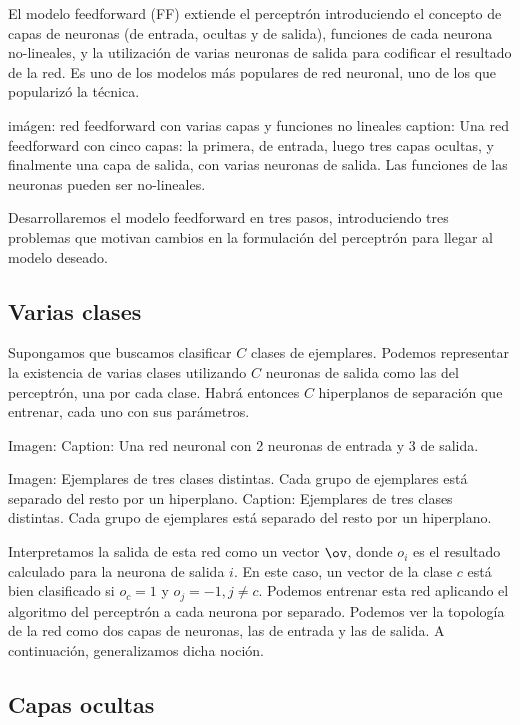 

El modelo feedforward (FF) extiende el perceptrón introduciendo el concepto de capas de neuronas (de entrada, ocultas y de salida), funciones de cada neurona no-lineales, y la utilización de varias neuronas de salida para codificar el resultado de la red. Es uno de los modelos más populares de red neuronal, uno de los que popularizó la técnica.

imágen: red feedforward con varias capas y funciones no lineales
caption: Una red feedforward con cinco capas: la primera, de entrada, luego tres capas ocultas, y finalmente una capa de salida, con varias neuronas de salida. Las funciones de las neuronas pueden ser no-lineales.

Desarrollaremos el modelo feedforward en tres pasos, introduciendo tres problemas que motivan cambios en la formulación del perceptrón para llegar al modelo deseado.

\subsection{Varias clases}

Supongamos que buscamos clasificar $C$ clases de ejemplares. Podemos representar la existencia de varias clases utilizando $C$ neuronas de salida como las del perceptrón, una por cada clase. Habrá entonces $C$ hiperplanos de separación que entrenar, cada uno con sus parámetros. 

Imagen:
Caption: Una red neuronal con 2 neuronas de entrada y 3 de salida. 


Imagen: Ejemplares de tres clases distintas. Cada grupo de ejemplares está separado del resto por un hiperplano.
Caption: Ejemplares de tres clases distintas. Cada grupo de ejemplares está separado del resto por un hiperplano.

Interpretamos la salida de esta red como un vector $\ov$, donde $o_i$ es el resultado calculado para la neurona de salida $i$. En este caso, un vector de la clase $c$ está bien clasificado si $o_c=1$ y $o_j=-1, j \neq c$. Podemos entrenar esta red aplicando el algoritmo del perceptrón a cada neurona por separado. Podemos ver la topología de la red como dos capas de neuronas, las de entrada y las de salida. A continuación, generalizamos dicha noción.

\subsection{Capas ocultas}

